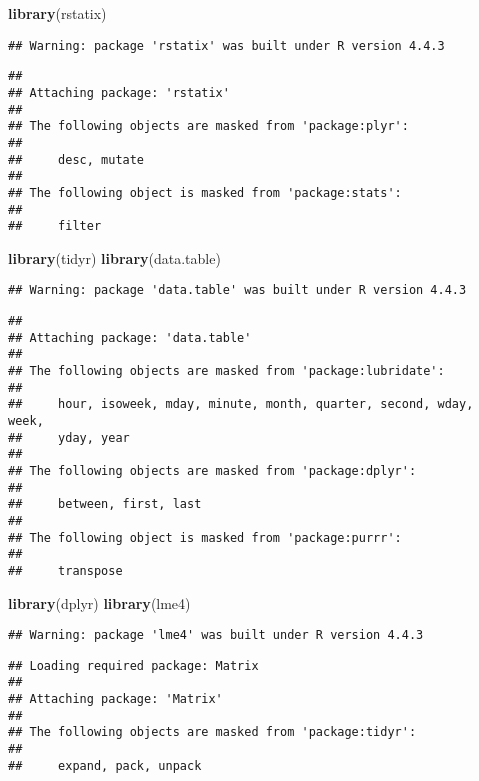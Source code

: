 \documentclass[
]{article}
\newenvironment{Shaded}{\begin{snugshade}}{\end{snugshade}}
\newcommand{\FunctionTok}[1]{\textcolor[rgb]{0.13,0.29,0.53}{\textbf{#1}}}
\newcommand{\NormalTok}[1]{#1}
\begin{document}
\begin{Shaded}
\begin{Highlighting}[]
\FunctionTok{library}\NormalTok{(rstatix)}
\end{Highlighting}
\end{Shaded}

\begin{verbatim}
## Warning: package 'rstatix' was built under R version 4.4.3
\end{verbatim}

\begin{verbatim}
## 
## Attaching package: 'rstatix'
## 
## The following objects are masked from 'package:plyr':
## 
##     desc, mutate
## 
## The following object is masked from 'package:stats':
## 
##     filter
\end{verbatim}

\begin{Shaded}
\begin{Highlighting}[]
\FunctionTok{library}\NormalTok{(tidyr)}
\FunctionTok{library}\NormalTok{(data.table)}
\end{Highlighting}
\end{Shaded}

\begin{verbatim}
## Warning: package 'data.table' was built under R version 4.4.3
\end{verbatim}

\begin{verbatim}
## 
## Attaching package: 'data.table'
## 
## The following objects are masked from 'package:lubridate':
## 
##     hour, isoweek, mday, minute, month, quarter, second, wday, week,
##     yday, year
## 
## The following objects are masked from 'package:dplyr':
## 
##     between, first, last
## 
## The following object is masked from 'package:purrr':
## 
##     transpose
\end{verbatim}

\begin{Shaded}
\begin{Highlighting}[]
\FunctionTok{library}\NormalTok{(dplyr)}
\FunctionTok{library}\NormalTok{(lme4)}
\end{Highlighting}
\end{Shaded}

\begin{verbatim}
## Warning: package 'lme4' was built under R version 4.4.3
\end{verbatim}

\begin{verbatim}
## Loading required package: Matrix
## 
## Attaching package: 'Matrix'
## 
## The following objects are masked from 'package:tidyr':
## 
##     expand, pack, unpack
\end{verbatim}
\end{document}
